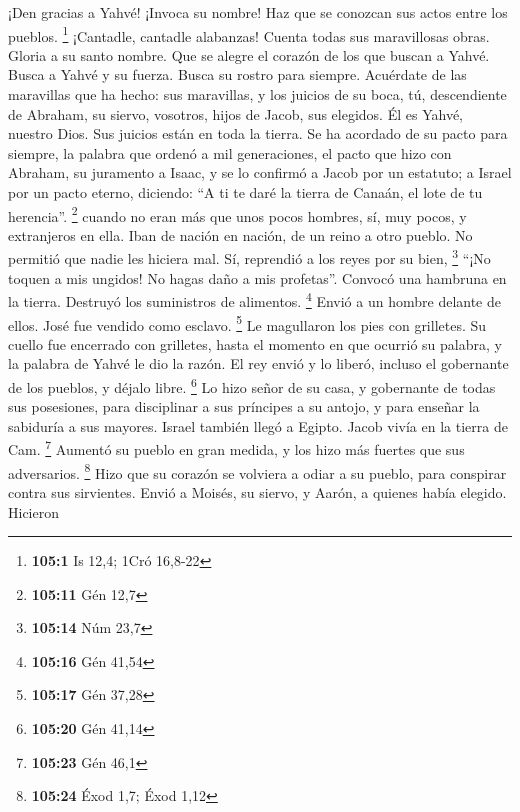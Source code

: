 \begin{paracol}{2}
 ¡Den gracias a Yahvé! ¡Invoca su nombre! Haz que se
conozcan sus actos entre los pueblos. \footnote{\textbf{105:1} Is 12,4;
  1Cró 16,8-22}  ¡Cantadle, cantadle alabanzas! Cuenta
todas sus maravillosas obras.  Gloria a su santo nombre.
Que se alegre el corazón de los que buscan a Yahvé.  Busca
a Yahvé y su fuerza. Busca su rostro para siempre. 
Acuérdate de las maravillas que ha hecho: sus maravillas, y los juicios
de su boca,  tú, descendiente de Abraham, su siervo,
vosotros, hijos de Jacob, sus elegidos.  Él es Yahvé,
nuestro Dios. Sus juicios están en toda la tierra.  Se ha
acordado de su pacto para siempre, la palabra que ordenó a mil
generaciones,  el pacto que hizo con Abraham, su juramento
a Isaac,  y se lo confirmó a Jacob por un estatuto; a
Israel por un pacto eterno,  diciendo: ``A ti te daré la
tierra de Canaán, el lote de tu herencia''. \footnote{\textbf{105:11}
  Gén 12,7}  cuando no eran más que unos pocos hombres,
sí, muy pocos, y extranjeros en ella.  Iban de nación en
nación, de un reino a otro pueblo.  No permitió que nadie
les hiciera mal. Sí, reprendió a los reyes por su bien, \footnote{\textbf{105:14}
  Núm 23,7}  ``¡No toquen a mis ungidos! No hagas daño a
mis profetas''.  Convocó una hambruna en la tierra.
Destruyó los suministros de alimentos. \footnote{\textbf{105:16} Gén
  41,54}  Envió a un hombre delante de ellos. José fue
vendido como esclavo. \footnote{\textbf{105:17} Gén 37,28}
 Le magullaron los pies con grilletes. Su cuello fue
encerrado con grilletes,  hasta el momento en que ocurrió
su palabra, y la palabra de Yahvé le dio la razón.  El
rey envió y lo liberó, incluso el gobernante de los pueblos, y déjalo
libre. \footnote{\textbf{105:20} Gén 41,14}  Lo hizo
señor de su casa, y gobernante de todas sus posesiones, 
para disciplinar a sus príncipes a su antojo, y para enseñar la
sabiduría a sus mayores.  Israel también llegó a Egipto.
Jacob vivía en la tierra de Cam. \footnote{\textbf{105:23} Gén 46,1}
 Aumentó su pueblo en gran medida, y los hizo más fuertes
que sus adversarios. \footnote{\textbf{105:24} Éxod 1,7; Éxod 1,12}
 Hizo que su corazón se volviera a odiar a su pueblo,
para conspirar contra sus sirvientes.  Envió a Moisés, su
siervo, y Aarón, a quienes había elegido.  Hicieron

\end{paracol}
